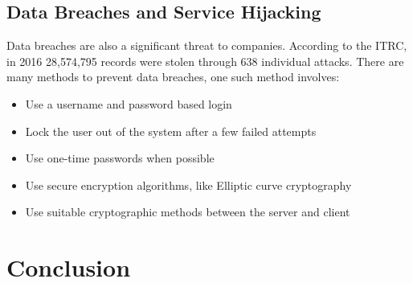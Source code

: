 \subsection{Data Breaches and Service Hijacking}

Data breaches are also a significant threat to companies. According to the ITRC, in 2016 28,574,795 records were stolen through 638 individual attacks\cite{barney_2016_2016}.
There are many methods to prevent data breaches, one such method\cite{doe_secure_2014} involves:

\begin{itemize}
    \item Use a username and password based login
    \item Lock the user out of the system after a few failed attempts
    \item Use one-time passwords when possible
    \item Use secure encryption algorithms, like Elliptic curve cryptography\cite{rahulamathavan_assessing_2015}
    \item Use suitable cryptographic methods between the server and client
\end{itemize}

\section{Conclusion}
